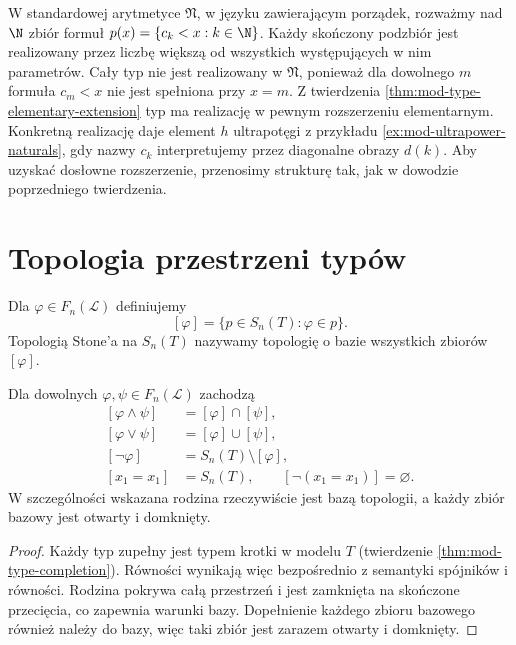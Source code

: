 \begin{przyklad}
\label{ex:mod-type-nonstandard}
W standardowej arytmetyce $\mathfrak N$, w języku zawierającym
porządek, rozważmy nad $\N$ zbiór formuł
$p(x)=\{c_k<x:k\in\N\}$.
Każdy skończony podzbiór jest realizowany przez liczbę większą
od wszystkich występujących w nim parametrów. Cały typ nie
jest realizowany w $\mathfrak N$, ponieważ dla dowolnego $m$
formuła $c_m<x$ nie jest spełniona przy $x=m$.
Z twierdzenia \ref{thm:mod-type-elementary-extension}
typ ma realizację w pewnym rozszerzeniu elementarnym.
Konkretną realizację daje element $h$ ultrapotęgi
z przykładu \ref{ex:mod-ultrapower-naturals}, gdy nazwy
$c_k$ interpretujemy przez diagonalne obrazy $d(k)$.
Aby uzyskać dosłowne rozszerzenie, przenosimy strukturę
tak, jak w dowodzie poprzedniego twierdzenia.
\end{przyklad}

\section{Topologia przestrzeni typów}
\begin{definicja}
\label{def:mod-stone-topology}
Dla $\varphi\in F_n(\mathcal L)$ definiujemy
\[
[\varphi]=\{p\in S_n(T):\varphi\in p\}.
\]
Topologią Stone'a na $S_n(T)$ nazywamy topologię
o bazie wszystkich zbiorów $[\varphi]$.
\end{definicja}

\begin{lemat}
\label{lem:mod-stone-basic}
Dla dowolnych $\varphi,\psi\in F_n(\mathcal L)$ zachodzą
\[
\begin{aligned}
[\varphi\land\psi]&=[\varphi]\cap[\psi],\\
[\varphi\lor\psi]&=[\varphi]\cup[\psi],\\
[\neg\varphi]&=S_n(T)\setminus[\varphi],\\
[x_1=x_1]&=S_n(T),\qquad [\neg(x_1=x_1)]=\varnothing.
\end{aligned}
\]
W szczególności wskazana rodzina rzeczywiście jest bazą
topologii, a każdy zbiór bazowy jest otwarty i domknięty.
\end{lemat}
\begin{proof}
Każdy typ zupełny jest typem krotki w modelu $T$
(twierdzenie \ref{thm:mod-type-completion}). Równości
wynikają więc bezpośrednio z semantyki spójników i równości.
Rodzina pokrywa całą przestrzeń i jest zamknięta na skończone
przecięcia, co zapewnia warunki bazy. Dopełnienie każdego
zbioru bazowego również należy do bazy, więc taki zbiór
jest zarazem otwarty i domknięty.
\end{proof}

